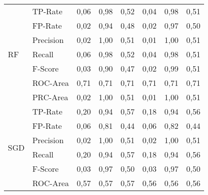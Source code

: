 \documentclass[master,twoside,extern,palatino]{rgseThesis}
\begin{document}
\begin{table}[ht]
{\begin{tabular}{|ll|rrr|rrr|}
\hline
\multirow{7}{*}{RF}  & TP-Rate   & 0,06             & 0,98                 & 0,52                     & 0,04             & 0,98                 & 0,51                      \\
                     & FP-Rate   & 0,02             & 0,94                 & 0,48                     & 0,02             & 0,97                 & 0,50                      \\
                     & Precision & 0,02             & 1,00                 & 0,51                     & 0,01             & 1,00                 & 0,51                      \\
                     & Recall    & 0,06             & 0,98                 & 0,52                     & 0,04             & 0,98                 & 0,51                      \\
                     & F-Score   & 0,03             & 0,90                 & 0,47                     & 0,02             & 0,99                 & 0,51                      \\
                     & ROC-Area  & 0,71             & 0,71                 & 0,71                     & 0,71             & 0,71                 & 0,71                      \\
                     & PRC-Area  & 0,02             & 1,00                 & 0,51                     & 0,01             & 1,00                 & 0,51                      \\ 
\hline
\multirow{7}{*}{SGD} & TP-Rate   & 0,20             & 0,94                 & 0,57                     & 0,18             & 0,94                 & 0,56                      \\
                     & FP-Rate   & 0,06             & 0,81                 & 0,44                     & 0,06             & 0,82                 & 0,44                      \\
                     & Precision & 0,02             & 1,00                 & 0,51                     & 0,02             & 1,00                 & 0,51                      \\
                     & Recall    & 0,20             & 0,94                 & 0,57                     & 0,18             & 0,94                 & 0,56                      \\
                     & F-Score   & 0,03             & 0,97                 & 0,50                     & 0,03             & 0,97                 & 0,50                      \\
                     & ROC-Area  & 0,57             & 0,57                 & 0,57                     & 0,56             & 0,56                 & 0,56                      \\

\end{tabular}}
\end{table}
\end{document}
